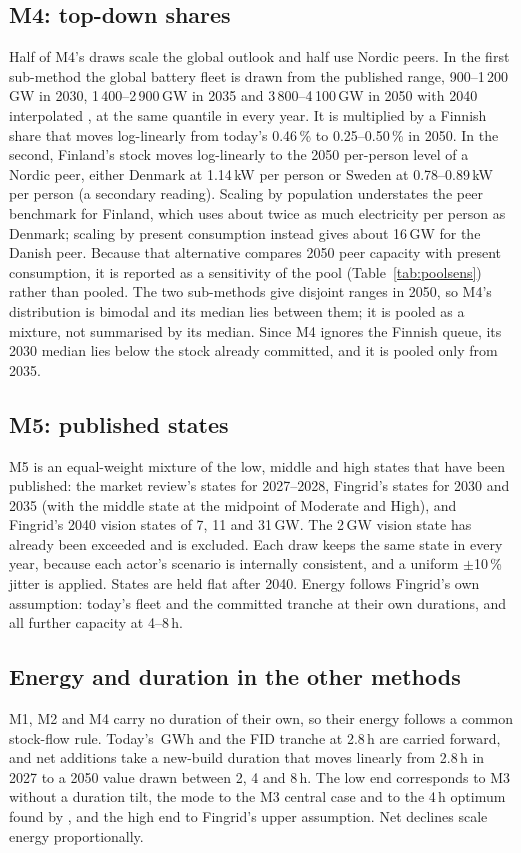 \documentclass[11pt]{article}
\begin{document}
\subsection{M4: top-down shares}
Half of M4's draws scale the global outlook and half use Nordic peers.
In the first sub-method the global battery fleet is drawn from the published range, 900--1\,200\,GW in 2030, 1\,400--2\,900\,GW in 2035 and 3\,800--4\,100\,GW in 2050 with 2040 interpolated \citep{iea2025weo,bnef2026neo,irena2024weto}, at the same quantile in every year. It is multiplied by a Finnish share that moves log-linearly from today's 0.46\,\% to 0.25--0.50\,\% in 2050.
In the second, Finland's stock moves log-linearly to the 2050 per-person level of a Nordic peer, either Denmark at 1.14\,kW per person or Sweden at 0.78--0.89\,kW per person (a secondary reading).
Scaling by population understates the peer benchmark for Finland, which uses about twice as much electricity per person as Denmark; scaling by present consumption instead gives about 16\,GW for the Danish peer. Because that alternative compares 2050 peer capacity with present consumption, it is reported as a sensitivity of the pool (Table~\ref{tab:poolsens}) rather than pooled.
The two sub-methods give disjoint ranges in 2050, so M4's distribution is bimodal and its median lies between them; it is pooled as a mixture, not summarised by its median.
Since M4 ignores the Finnish queue, its 2030 median lies below the stock already committed, and it is pooled only from 2035.

\subsection{M5: published states}
M5 is an equal-weight mixture of the low, middle and high states that have been published: the market review's states for 2027--2028, Fingrid's states for 2030 and 2035 (with the middle state at the midpoint of Moderate and High), and Fingrid's 2040 vision states of 7, 11 and 31\,GW. The 2\,GW vision state has already been exceeded and is excluded.
Each draw keeps the same state in every year, because each actor's scenario is internally consistent, and a uniform $\pm$10\,\% jitter is applied. States are held flat after 2040.
Energy follows Fingrid's own assumption: today's fleet and the committed tranche at their own durations, and all further capacity at 4--8\,h.

\subsection{Energy and duration in the other methods}
M1, M2 and M4 carry no duration of their own, so their energy follows a common stock-flow rule. Today's \,GWh and the FID tranche at 2.8\,h are carried forward, and net additions take a new-build duration that moves linearly from 2.8\,h in 2027 to a 2050 value drawn between 2, 4 and 8\,h. The low end corresponds to M3 without a duration tilt, the mode to the M3 central case and to the 4\,h optimum found by \citet{landy2026hybrids}, and the high end to Fingrid's upper assumption. Net declines scale energy proportionally.
\end{document}
